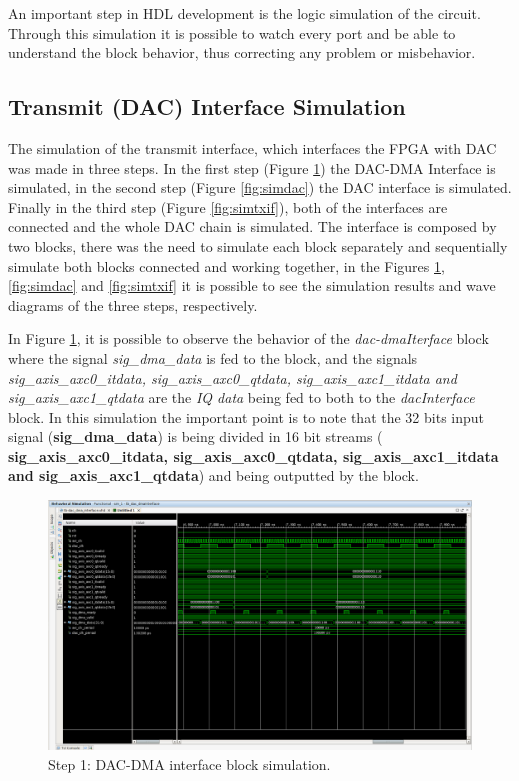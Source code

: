 An important step in HDL development is the logic simulation of the circuit.
Through this simulation it is possible to watch every port and be able to
understand the block behavior, thus correcting any problem or misbehavior.

\subsection{Transmit (DAC) Interface Simulation}

The simulation of the transmit interface, which interfaces the FPGA with DAC was
made in three steps. In the first step (Figure \ref{fig:simdacdma}) the DAC-DMA
Interface is simulated, in the second step (Figure \ref{fig:simdac}) the DAC
interface is simulated. Finally in the third step (Figure \ref{fig:simtxif}),
both of the interfaces are connected and the whole DAC chain is simulated. The
interface is composed by two blocks, there was the need to simulate each block
separately and sequentially simulate both blocks connected and working together,
in the Figures \ref{fig:simdacdma}, \ref{fig:simdac} and \ref{fig:simtxif} it is
possible to see the simulation results and wave diagrams of the three steps,
respectively.

In Figure \ref{fig:simdacdma}, it is possible to observe the behavior of the
\textit{dac-dmaIterface} block where the signal \textit{sig\_dma\_data} is fed
to the block, and the signals \textit{ sig\_axis\_axc0\_itdata,
sig\_axis\_axc0\_qtdata, sig\_axis\_axc1\_itdata and sig\_axis\_axc1\_qtdata}
are the \textit{IQ data} being fed to both to the \textit{dacInterface} block.
In this simulation the important point is to note that the 32 bits input signal
(\textbf{sig\_dma\_data}) is being divided in 16 bit streams (\textbf{
sig\_axis\_axc0\_itdata, sig\_axis\_axc0\_qtdata, sig\_axis\_axc1\_itdata and
sig\_axis\_axc1\_qtdata}) and being outputted by the block.

\begin{figure}[htbp]
    \centering
    \includegraphics[height=.3\textwidth, width=.85\textwidth,
    trim={{.13\textwidth} {.90\textwidth} {.05\textwidth} {.15\textwidth}},
    clip]{./figures/dac_dmaInterface}
    \caption{ Step 1: DAC-DMA interface block simulation.
    \label{fig:simdacdma}}
\end{figure}

